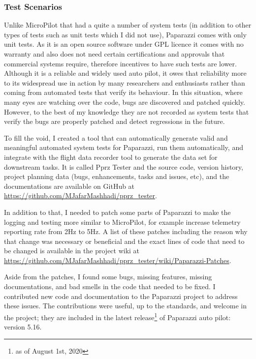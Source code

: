 \subsubsection{Test Scenarios}
Unlike MicroPilot that had a quite a number of system tests (in addition to other types of tests such as unit tests which I did not use), Paparazzi comes with only unit tests. As it is an open source software under GPL licence it comes with no warranty and also does not need certain certifications and approvals that commercial systems require, therefore incentives to have such tests are lower. 
Although it is a reliable and widely used auto pilot, it owes that reliability more to its widespread use in action by many researchers and enthusiasts rather than coming from automated tests that verify its behaviour.
In this situation, where many eyes are watching over the code, bugs are discovered and patched quickly. However, to the best of my knowledge they are not recorded as system tests that verify the bugs are properly patched and detect regressions in the future.

To fill the void, I created a tool that can automatically generate valid and meaningful automated system tests for Paparazzi, run them automatically, and integrate with the flight data recorder tool to generate the data set for downstream tasks. It is called Pprz Tester and the source code, version history, project planning data (bugs, enhancements, tasks and issues, etc), and the documentations are available on GitHub at \url{https://github.com/MJafarMashhadi/pprz_tester}. 

In addition to that, I needed to patch some parts of Paparazzi to make the logging and testing more similar to MicroPilot, for example increase telemetry reporting rate from 2Hz to 5Hz. A list of these patches including the reason why that change was necessary or beneficial and the exact lines of code that need to be changed is available in the project wiki at \url{https://github.com/MJafarMashhadi/pprz_tester/wiki/Paparazzi-Patches}.

Aside from the patches, I found some bugs, missing features, missing documentations, and bad smells in the code that needed to be fixed. I contributed new code and documentation to the Paparazzi project to address these issues. The contributions were useful, up to the standards, and welcome in the project; they are included in the latest release\footnote{as of August 1st, 2020} of Paparazzi auto pilot: version 5.16.

